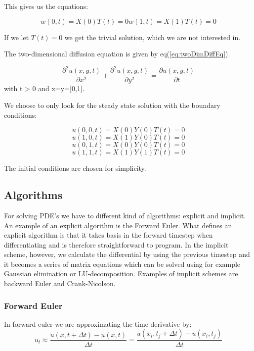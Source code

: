 \documentclass[a4paper,10pt]{article}
\begin{document}
This gives us the equations:

\begin{equation}
w(0,t) = X(0)T(t) = 0 
w(1,t) = X(1)T(t) = 0
\label{eq:initialCond}
\end{equation}

If we let $T(t) = 0$ we get the trivial solution, which we are not interested in.

The two-dimensional diffusion equation is given by eq(\ref{eq:twoDimDiffEq}).

\begin{equation}
  \frac{\partial^2 u(x,y,t)}{\partial x^2} + \frac{\partial^2 u(x,y,t)}{\partial y^2} = \frac{\partial u(x,y,t)}{\partial t}
\label{eq:twoDimDiffEq}
\end{equation}
with t > 0 and x=y=[0,1].

We choose to only look for the steady state solution with the boundary conditions:

\[ u(0,0,t) = X(0)Y(0)T(t) = 0 \]
\[ u(1,0,t) = X(1)Y(0)T(t) = 0 \]
\[ u(0,1,t) = X(0)Y(0)T(t) = 0 \]
\[ u(1,1,t) = X(1)Y(1)T(t) = 0 \]

The initial conditions are chosen for simplicity.

\subsection{Algorithms}
For solving PDE's we have to different kind of algorithms: explicit and implicit. An example of an explicit algorithm is the Forward Euler.
What defines an explicit algorithm is that it takes basis in the forward timestep when differentiating and is therefore straightforward to program.
In the implicit scheme, however, we calculate the differential by using the previous timestep and it becomes a series of matrix equations which can be solved 
using for example Gaussian elimination or LU-decomposition. Examples of implicit schemes are backward Euler and Crank-Nicolson.

\subsubsection{Forward Euler}

In forward euler we are approximating the time derivative by:
\begin{equation}
u_t\approx \frac{u(x,t+\Delta t)-u(x,t)}{\Delta t}=\frac{u(x_i,t_j+\Delta t)-u(x_i,t_j)}{\Delta t}
\label{eq:forward_euler}
\end{equation}
\end{document}
